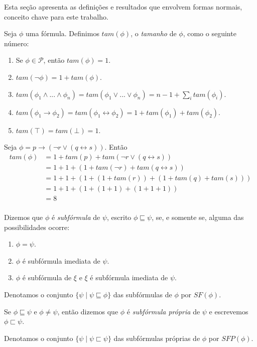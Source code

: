 \indent

Esta seção apresenta as definições e resultados que envolvem formas normais, conceito chave para este trabalho.

\begin{definition}
	Seja $\phi$ uma fórmula. Definimos $tam(\phi)$, o \emph{tamanho} de $\phi$, como o seguinte número:
	\begin{enumerate}
		\item Se $\phi \in \mathcal{P}$, então $tam(\phi) = 1$.
		\item $tam(\neg \phi) = 1 + tam(\phi)$.
		\item $tam(\phi_1 \wedge ... \wedge \phi_n) = tam(\phi_1 \vee ... \vee \phi_n) = n - 1 + \sum_i tam(\phi_i)$.
		\item $tam(\phi_1 \rightarrow \phi_2) = tam(\phi_1 \leftrightarrow \phi_2) = 1 + tam(\phi_1) + tam(\phi_2)$.
		\item $tam(\top) = tam(\bot) = 1$.
	\end{enumerate}
\end{definition}

\begin{example}
	Seja $\phi = p \rightarrow (\neg r \vee (q \leftrightarrow s))$. Então
	\begin{equation*}
	\begin{split}
	tam(\phi) & = 1 + tam(p) + tam(\neg r \vee (q \leftrightarrow s))\\
	& = 1 + 1 + (1 + tam(\neg r) + tam(q \leftrightarrow s))\\
	& = 1 + 1 + (1 + (1 + tam(r)) + (1 + tam(q) + tam(s)))\\
	& = 1 + 1 + (1 + (1 + 1) + (1 + 1 + 1))\\
	& = 8\\
	\end{split}
	\end{equation*}
\end{example}

\begin{definition}
	Dizemos que $\phi$ é \emph{subfórmula} de $\psi$, escrito $\phi \sqsubseteq \psi$, se, e somente se, alguma das possibilidades ocorre:
	\begin{enumerate}
		\item $\phi = \psi$.
		\item $\phi$ é subfórmula imediata de $\psi$.
		\item $\phi$ é subfórmula de $\xi$ e $\xi$ é subfórmula imediata de $\psi$.
	\end{enumerate}
	
	Denotamos o conjunto $\{\psi \mid \psi \sqsubseteq \phi \}$ das subfórmulas de $\phi$ por $SF(\phi)$.
	
	Se $\phi \sqsubseteq \psi$ e $\phi \neq \psi$, então dizemos que $\phi$ é \emph{subfórmula própria} de $\psi$ e escrevemos $\phi \sqsubset \psi$.
	
	Denotamos o conjunto $\{\psi \mid \psi \sqsubset \psi \}$ das subfórmulas próprias de $\phi$ por $SFP(\phi)$.
\end{definition}

